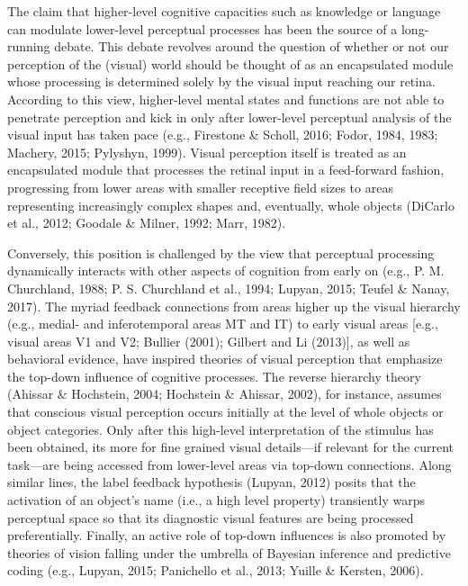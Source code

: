 \documentclass[
  english,
  doc,12pt,twoside,floatsintext]{apa7}
\begin{document}
The claim that higher-level cognitive capacities such as knowledge or language can modulate lower-level perceptual processes has been the source of a long-running debate. This debate revolves around the question of whether or not our perception of the (visual) world should be thought of as an encapsulated module whose processing is determined solely by the visual input reaching our retina. According to this view, higher-level mental states and functions are not able to penetrate perception and kick in only after lower-level perceptual analysis of the visual input has taken pace (e.g., Firestone \& Scholl, 2016; Fodor, 1984, 1983; Machery, 2015; Pylyshyn, 1999). Visual perception itself is treated as an encapsulated module that processes the retinal input in a feed-forward fashion, progressing from lower areas with smaller receptive field sizes to areas representing increasingly complex shapes and, eventually, whole objects (DiCarlo et al., 2012; Goodale \& Milner, 1992; Marr, 1982).

Conversely, this position is challenged by the view that perceptual processing dynamically interacts with other aspects of cognition from early on (e.g., P. M. Churchland, 1988; P. S. Churchland et al., 1994; Lupyan, 2015; Teufel \& Nanay, 2017). The myriad feedback connections from areas higher up the visual hierarchy (e.g., medial- and inferotemporal areas MT and IT) to early visual areas {[}e.g., visual areas V1 and V2; Bullier (2001); Gilbert and Li (2013){]}, as well as behavioral evidence, have inspired theories of visual perception that emphasize the top-down influence of cognitive processes. The reverse hierarchy theory (Ahissar \& Hochstein, 2004; Hochstein \& Ahissar, 2002), for instance, assumes that conscious visual perception occurs initially at the level of whole objects or object categories. Only after this high-level interpretation of the stimulus has been obtained, its more for fine grained visual details---if relevant for the current task---are being accessed from lower-level areas via top-down connections. Along similar lines, the label feedback hypothesis (Lupyan, 2012) posits that the activation of an object's name (i.e., a high level property) transiently warps perceptual space so that its diagnostic visual features are being processed preferentially. Finally, an active role of top-down influences is also promoted by theories of vision falling under the umbrella of Bayesian inference and predictive coding (e.g., Lupyan, 2015; Panichello et al., 2013; Yuille \& Kersten, 2006).
\end{document}
